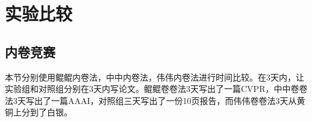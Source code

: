 \section{实验比较}\label{numerical experiments}

\subsection{内卷竞赛}

本节分别使用鲲鲲内卷法，中中内卷法，伟伟内卷法进行时间比较。在3天内，让实验组和对照组分别在3天内写论文。鲲鲲卷卷法3天写出了一篇CVPR，中中卷卷法3天写出了一篇AAAI，对照组三天写出了一份10页报告，而伟伟卷卷法3天从黄铜上分到了白银。
